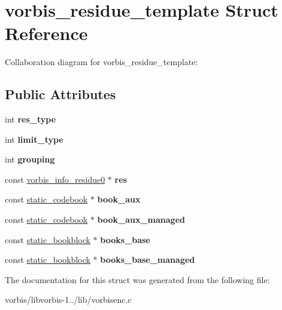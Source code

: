 \hypertarget{structvorbis__residue__template}{\section{vorbis\+\_\+residue\+\_\+template Struct Reference}
\label{structvorbis__residue__template}
}


Collaboration diagram for vorbis\+\_\+residue\+\_\+template\+:
\subsection*{Public Attributes}
\begin{DoxyCompactItemize}
\item 
\hypertarget{structvorbis__residue__template_a15084c4bd97066e1bf874f93e41db0ea}{int {\bfseries res\+\_\+type}}\label{structvorbis__residue__template_a15084c4bd97066e1bf874f93e41db0ea}

\item 
\hypertarget{structvorbis__residue__template_a5da353b9dcda20f8e4e7a4f6087675a0}{int {\bfseries limit\+\_\+type}}\label{structvorbis__residue__template_a5da353b9dcda20f8e4e7a4f6087675a0}

\item 
\hypertarget{structvorbis__residue__template_ad4e0d91b38da3a639e860eeb75fcd863}{int {\bfseries grouping}}\label{structvorbis__residue__template_ad4e0d91b38da3a639e860eeb75fcd863}

\item 
\hypertarget{structvorbis__residue__template_a7b4e0d90fa41a67a95513cfae4adec59}{const \hyperlink{structvorbis__info__residue0}{vorbis\+\_\+info\+\_\+residue0} $\ast$ {\bfseries res}}\label{structvorbis__residue__template_a7b4e0d90fa41a67a95513cfae4adec59}

\item 
\hypertarget{structvorbis__residue__template_a1758621ca074816c2a87102461e408fc}{const \hyperlink{structstatic__codebook}{static\+\_\+codebook} $\ast$ {\bfseries book\+\_\+aux}}\label{structvorbis__residue__template_a1758621ca074816c2a87102461e408fc}

\item 
\hypertarget{structvorbis__residue__template_ab4ea95da7d287d0dc6df64c957092837}{const \hyperlink{structstatic__codebook}{static\+\_\+codebook} $\ast$ {\bfseries book\+\_\+aux\+\_\+managed}}\label{structvorbis__residue__template_ab4ea95da7d287d0dc6df64c957092837}

\item 
\hypertarget{structvorbis__residue__template_ad760c5513a8f21ed9ef3284d0d33c488}{const \hyperlink{structstatic__bookblock}{static\+\_\+bookblock} $\ast$ {\bfseries books\+\_\+base}}\label{structvorbis__residue__template_ad760c5513a8f21ed9ef3284d0d33c488}

\item 
\hypertarget{structvorbis__residue__template_a3d33d8f56cfa34dac0c33e11e8323ab6}{const \hyperlink{structstatic__bookblock}{static\+\_\+bookblock} $\ast$ {\bfseries books\+\_\+base\+\_\+managed}}\label{structvorbis__residue__template_a3d33d8f56cfa34dac0c33e11e8323ab6}

\end{DoxyCompactItemize}


The documentation for this struct was generated from the following file\+:\begin{DoxyCompactItemize}
\item 
vorbis/libvorbis-\/1../lib/vorbisenc.\+c\end{DoxyCompactItemize}
